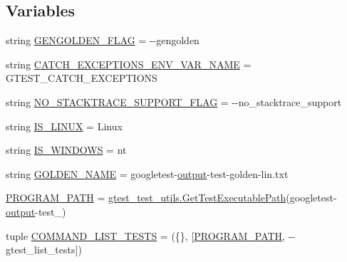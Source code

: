 \subsection*{Variables}
\begin{DoxyCompactItemize}
\item 
string \mbox{\hyperlink{namespacegoogletest-output-test_ad0d41196cc1dba894e54cd7129b5fc0a}{G\+E\+N\+G\+O\+L\+D\+E\+N\+\_\+\+F\+L\+AG}} = \textquotesingle{}-\/-\/gengolden\textquotesingle{}
\item 
string \mbox{\hyperlink{namespacegoogletest-output-test_ae6116e1d24bc75b7559e53353b8ee91c}{C\+A\+T\+C\+H\+\_\+\+E\+X\+C\+E\+P\+T\+I\+O\+N\+S\+\_\+\+E\+N\+V\+\_\+\+V\+A\+R\+\_\+\+N\+A\+ME}} = \textquotesingle{}G\+T\+E\+S\+T\+\_\+\+C\+A\+T\+C\+H\+\_\+\+E\+X\+C\+E\+P\+T\+I\+O\+NS\textquotesingle{}
\item 
string \mbox{\hyperlink{namespacegoogletest-output-test_aa5200b284ce09415c0061e96811cf24c}{N\+O\+\_\+\+S\+T\+A\+C\+K\+T\+R\+A\+C\+E\+\_\+\+S\+U\+P\+P\+O\+R\+T\+\_\+\+F\+L\+AG}} = \textquotesingle{}-\/-\/no\+\_\+stacktrace\+\_\+support\textquotesingle{}
\item 
string \mbox{\hyperlink{namespacegoogletest-output-test_a7ff614069cc92eea5943d720b479afd7}{I\+S\+\_\+\+L\+I\+N\+UX}} = \textquotesingle{}Linux\textquotesingle{}
\item 
string \mbox{\hyperlink{namespacegoogletest-output-test_a88183ad6c50d9f025ab11d07e5b4d9ec}{I\+S\+\_\+\+W\+I\+N\+D\+O\+WS}} = \textquotesingle{}nt\textquotesingle{}
\item 
string \mbox{\hyperlink{namespacegoogletest-output-test_a66b45fb215424c968b479fbf864f1e7f}{G\+O\+L\+D\+E\+N\+\_\+\+N\+A\+ME}} = \textquotesingle{}googletest-\/\mbox{\hyperlink{namespacegoogletest-output-test_ab3df9ce09186215a36c30454cf282417}{output}}-\/test-\/golden-\/lin.\+txt\textquotesingle{}
\item 
\mbox{\hyperlink{namespacegoogletest-output-test_a36302384d49a636defe86704a422acb2}{P\+R\+O\+G\+R\+A\+M\+\_\+\+P\+A\+TH}} = \mbox{\hyperlink{namespacegtest__test__utils_a89ed3717984a80ffbb7a9c92f71b86a2}{gtest\+\_\+test\+\_\+utils.\+Get\+Test\+Executable\+Path}}(\textquotesingle{}googletest-\/\mbox{\hyperlink{namespacegoogletest-output-test_ab3df9ce09186215a36c30454cf282417}{output}}-\/test\+\_\+\textquotesingle{})
\item 
tuple \mbox{\hyperlink{namespacegoogletest-output-test_accb05a0a5c9b083723186bb6116f928f}{C\+O\+M\+M\+A\+N\+D\+\_\+\+L\+I\+S\+T\+\_\+\+T\+E\+S\+TS}} = (\{\}, \mbox{[}\mbox{\hyperlink{namespacegoogletest-output-test_a36302384d49a636defe86704a422acb2}{P\+R\+O\+G\+R\+A\+M\+\_\+\+P\+A\+TH}}, \textquotesingle{}-\/-\/gtest\+\_\+list\+\_\+tests\textquotesingle{}\mbox{]})

\end{DoxyCompactItemize}
